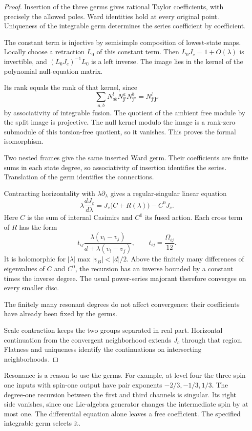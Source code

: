 \begin{proof}
Insertion of the three germs gives rational Taylor coefficients,
with precisely the allowed poles. Ward identities hold at every
original point. Uniqueness of the integrable germ determines the
series coefficient by coefficient.

The constant term is injective by semisimple composition of
lowest-state maps. Locally choose a retraction \(L_0\) of this
constant term. Then \(L_0J_c=1+O(\lambda)\) is invertible, and
\((L_0J_c)^{-1}L_0\) is a left inverse.
The image lies in the kernel of the polynomial null-equation
matrix.

Its rank equals the rank of that kernel, since
\[
 \sum_{a,b}N^l_{ab}
             N^a_{\mathbf j'}N^b_{\mathbf j''}
   =N^l_{\mathbf j'\mathbf j''}
\]
by associativity of integrable fusion.
The quotient of the ambient free module by the split image is
projective. The null kernel modulo the image is a rank-zero
submodule of this torsion-free quotient, so it vanishes.
This proves the formal isomorphism.

Two nested frames give the same inserted Ward germ.
Their coefficients are finite sums in each state degree, so
associativity of insertion identifies the series.
Translation of the germ identifies the connections.

Contracting horizontality with \(\lambda\partial_\lambda\)
gives a regular-singular linear equation
\[
 \lambda\frac{dJ_c}{d\lambda}
   =J_c\bigl(C+R(\lambda)\bigr)-C^0J_c.
\]
Here \(C\) is the sum of internal Casimirs and \(C^0\) its fused
action. Each cross term of \(R\) has the form
\[
 t_{ij}\frac{\lambda(v_i-v_j)}
                  {d+\lambda(v_i-v_j)},\qquad
 t_{ij}=\frac{\Omega_{ij}}{12}.
\]
It is holomorphic for
\(|\lambda|\max|v_B|<|d|/2\).
Above the finitely many differences of eigenvalues of \(C\)
and \(C^0\), the recursion has an inverse bounded by a constant
times the inverse degree. The usual power-series majorant
therefore converges on every smaller disc.

The finitely many resonant degrees do not affect convergence:
their coefficients have already been fixed by the germs.

Scale contraction keeps the two groups separated in real part.
Horizontal continuation from the convergent neighborhood extends
\(J_c\) through that region. Flatness and uniqueness identify
the continuations on intersecting neighborhoods.
\end{proof}

Resonance is a reason to use the germs. For example, at level four
the three spin-one inputs with spin-one output have pair exponents
\(-2/3,-1/3,1/3\). The degree-one recursion between the first and
third channels is singular. Its right side vanishes, since one
Lie-algebra generator changes the intermediate spin by at most one.
The differential equation alone leaves a free coefficient.
The specified integrable germ selects it.

